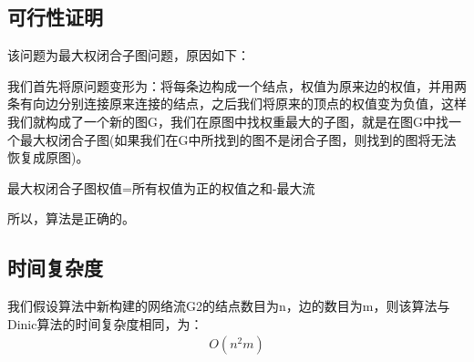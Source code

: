 \documentclass{article}
\begin{document}
		\vspace{5cm}
		\subsection{可行性证明}
		该问题为最大权闭合子图问题，原因如下：
		
		我们首先将原问题变形为：将每条边构成一个结点，权值为原来边的权值，并用两条有向边分别连接原来连接的结点，之后我们将原来的顶点的权值变为负值，这样我们就构成了一个新的图G，我们在原图中找权重最大的子图，就是在图G中找一个最大权闭合子图(如果我们在G中所找到的图不是闭合子图，则找到的图将无法恢复成原图)。
		
		最大权闭合子图权值=所有权值为正的权值之和-最大流
		
		所以，算法是正确的。
		\subsection{时间复杂度}
		我们假设算法中新构建的网络流G2的结点数目为n，边的数目为m，则该算法与Dinic算法的时间复杂度相同，为：
		\begin{equation*}
		\begin{split}
		O(n^{2}m)
		\end{split}
		\end{equation*}
		
		
\end{document}
